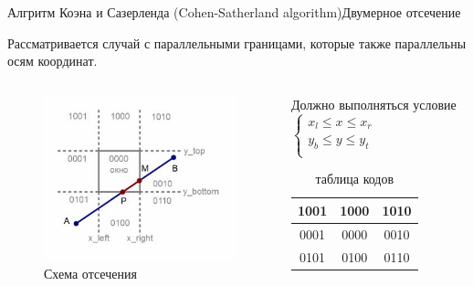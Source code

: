 \documentclass{beamer}
\begin{document}
	\begin{frame}{Алгритм Коэна и Сазерленда (Cohen-Satherland algorithm)}{Двумерное отсечение}

		Рассматривается случай с параллельными границами, которые также параллельны осям координат.
		\begin{columns}
			\begin{column}{0.4\textwidth}
				\begin{figure} 
					\includegraphics[width=\textwidth]{images/clipping_ex3.jpg}
					\caption{Схема отсечения}
				\end{figure}
			\end{column}
			\begin{column}{0.6\textwidth}
				\centering
				Должно выполняться условие
				$
					\begin{cases}
						x_l \leqslant x \leqslant x_r \\
						y_b \leqslant y \leqslant y_t	\\
					\end{cases}
				$				
				
				\begin{table}
					\caption{таблица кодов}
					\begin{center}
						\begin{tabular}{|c|c|c|}
							\hline
							1001 & 1000 & 1010 \\
							\hline
							0001 & 0000 & 0010 \\
							\hline
							0101 & 0100 & 0110 \\
							\hline
						\end{tabular}
					\end{center}
				\end{table}


\end{column}
\end{columns}
\end{frame}
\end{document}
